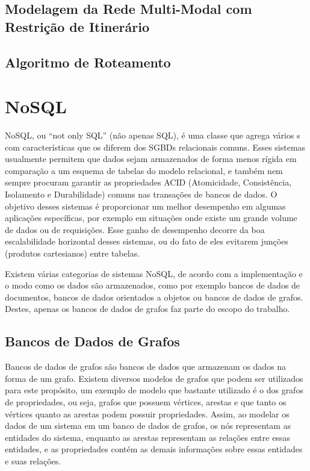 \subsection{Modelagem da Rede Multi-Modal com Restrição de Itinerário}



\subsection{Algoritmo de Roteamento}

\section{NoSQL}

NoSQL, ou ``not only SQL'' (não apenas SQL), é uma classe que agrega vários s com características que os diferem dos SGBDs relacionais comuns.
Esses sistemas usualmente permitem que dados sejam armazenados de forma menos rígida em comparação a um esquema de tabelas do modelo relacional, e também nem sempre procuram garantir as propriedades ACID (Atomicidade, Consistência, Isolamento e Durabilidade) comuns nas transações de bancos de dados.
O objetivo desses sistemas é proporcionar um melhor desempenho em algumas aplicações específicas, por exemplo em situações onde existe um grande volume de dados ou de requisições. Esse ganho de desempenho decorre da boa escalabilidade horizontal desses sistemas, ou do fato de eles evitarem junções (produtos cartesianos) entre tabelas.

Existem várias categorias de sistemas NoSQL, de acordo com a implementação e o modo como os dados são armazenados, como por exemplo bancos de dados de documentos, bancos de dados orientados a objetos ou bancos de dados de grafos.
Destes, apenas os bancos de dados de grafos faz parte do escopo do trabalho.

\subsection{Bancos de Dados de Grafos}


Bancos de dados de grafos são bancos de dados que armazenam os dados na forma de um grafo. Existem diversos modelos de grafos que podem ser utilizados para este propósito, um exemplo de modelo que bastante utilizado é o dos grafos de propriedades, ou seja, grafos que possuem vértices, arestas e que tanto os vértices quanto as arestas podem possuir propriedades.
Assim, ao modelar os dados de um sistema em um banco de dados de grafos, os nós representam as entidades do sistema, enquanto as arestas representam as relações entre essas entidades, e as propriedades contém as demais informações sobre essas entidades e suas relações.


